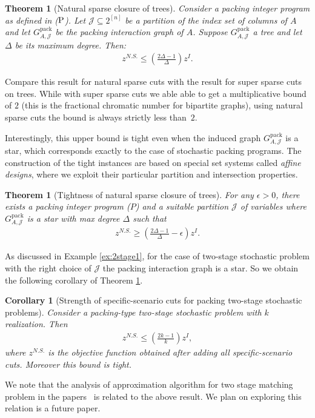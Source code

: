 \documentclass[smallextended]{svjour3}
\newtheorem{theorem}[proposition]{Theorem}
\newtheorem{corollary}[proposition]{Corollary}
\begin{document}
\begin{theorem}[Natural sparse closure of trees]\label{thrm:nstree}
	Consider a packing integer program as defined in ($\textup{P}$). Let $\mathcal{J} \subseteq 2^{[n]}$ be a partition of the index
set of columns of $A$ and let ${G^{\textrm{pack}}_{A, {\mathcal{J}}}}$ be the packing interaction graph of $A$. Suppose ${G^{\textrm{pack}}_{A, {\mathcal{J}}}}$ a tree and let $\Delta$ be its maximum degree. Then:
\begin{eqnarray*}
z^{N.S.} \leq \left(\frac{2\Delta -1}{\Delta} \right)z^I.
\end{eqnarray*}
\end{theorem}

Compare this result for natural sparse cuts with the result for super sparse cuts on trees. While with super sparse cuts we able able to get a multiplicative bound of $2$ (this is the fractional chromatic number for bipartite graphs), using natural sparse cuts the bound is always strictly less than~$2$.

	Interestingly, this upper bound is tight even when the induced graph ${G^{\textrm{pack}}_{A, {\mathcal{J}}}}$ is a star, which corresponds exactly to the case of stochastic packing programs. The construction of the tight instances are based on special set systems called \emph{affine designs}, where we exploit their particular partition and intersection properties.

\begin{theorem}[Tightness of natural sparse closure of trees] \label{thm:LBstar}
For any $\epsilon > 0$, there exists a packing integer program ($P$) and a suitable partition ${\mathcal{J}}$ of variables where ${G^{\textrm{pack}}_{A, {\mathcal{J}}}}$ is a star with max degree $\Delta$ such that 
\begin{eqnarray*}
z^{N.S.} \geq \left(\frac{2\Delta-1}{\Delta} - \epsilon \right)z^I.
\end{eqnarray*}
\end{theorem}

As discussed in Example \ref{ex:2stage1}, for the case of two-stage stochastic problem with the right choice of $\mathcal{J}$ the packing interaction graph is a star. So we obtain the following corollary of Theorem \ref{thrm:nstree}.
\begin{corollary}[Strength of specific-scenario cuts for packing two-stage stochastic problems]
Consider a packing-type two-stage stochastic problem with $k$ realization. Then 
\begin{eqnarray*}
z^{N.S.} \leq \left(\frac{2k-1}{k} \right)z^I,
\end{eqnarray*}
where $z^{N.S.}$ is the objective function obtained after adding all specific-scenario cuts. Moreover this bound is tight.
\end{corollary}
We note that the analysis of approximation algorithm for two stage matching problem in the papers~\cite{EscoffierGMS2010,KongSchaefer2006} is related to the above result. We plan on exploring this relation is a future paper.   
\end{document}
